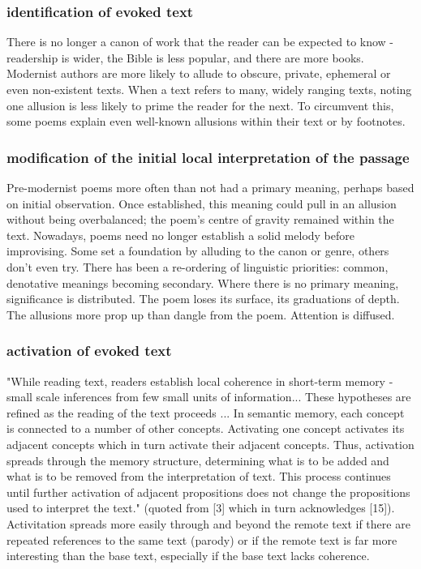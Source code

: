 \documentclass[11pt]{article}
\begin{document}
\subsubsection*{identification of evoked text}

There is no longer a canon of work that the reader can be expected to know - readership is wider, the Bible is less popular, and there are more books. Modernist authors are more likely to allude to obscure, private, ephemeral or even non-existent texts. When a text refers to many, widely ranging texts, noting one allusion is less likely to prime the reader for the next. To circumvent this, some poems explain even well-known allusions within their text or by footnotes.

\subsubsection*{modification of the initial local interpretation of the passage}

Pre-modernist poems more often than not had a primary meaning, perhaps based on initial observation. Once established, this meaning could pull in an allusion without being overbalanced; the poem's centre of gravity remained within the text. Nowadays, poems need no longer establish a solid melody before improvising. Some set a foundation by alluding to the canon or genre, others don't even try. There has been a re-ordering of linguistic priorities: common, denotative meanings becoming secondary. Where there is no primary meaning, significance is distributed. The poem loses its surface, its graduations of depth. The allusions more prop up than dangle from the poem. Attention is diffused.

\subsubsection*{activation of evoked text}

"While reading text, readers establish local coherence in short-term memory - small scale inferences from few small units of information... These hypotheses are refined as the reading of the text proceeds ... In semantic memory, each concept is connected to a number of other concepts. Activating one concept activates its adjacent concepts which in turn activate their adjacent concepts. Thus, activation spreads through the memory structure, determining what is to be added and what is to be removed from the interpretation of text. This process continues until further activation of adjacent propositions does not change the propositions used to interpret the text." (quoted from [3] which in turn acknowledges [15]). Activitation spreads more easily through and beyond the remote text if there are repeated references to the same text (parody) or if the remote text is far more interesting than the base text, especially if the base text lacks coherence.
\end{document}
